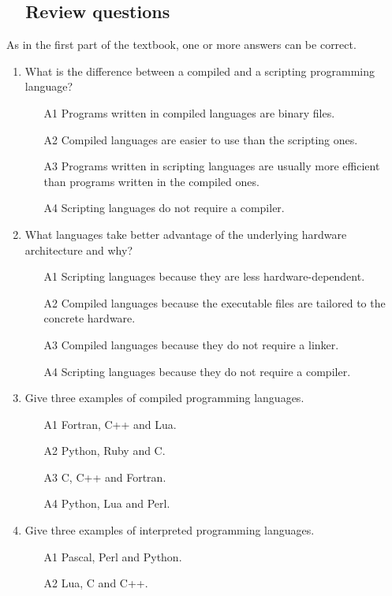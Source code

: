 \subsection{\ \ Review questions}

As in the first part of the textbook, one or more answers can be correct. 
\begin{enumerate}
\item What is the difference between a compiled and a scripting programming language?
\begin{enumerate}
\item[A1] Programs written in compiled languages are binary files. 
\item[A2] Compiled languages are easier to use than the scripting ones.
\item[A3] Programs written in scripting languages are usually more efficient than programs 
          written in the compiled ones.
\item[A4] Scripting languages do not require a compiler.
\end{enumerate}
\item What languages take better advantage of the underlying hardware architecture
      and why?
\begin{enumerate}
\item[A1] Scripting languages because they are less hardware-dependent.
\item[A2] Compiled languages because the executable files are tailored 
          to the concrete hardware.
\item[A3] Compiled languages because  they do not require a linker.
\item[A4] Scripting languages because they do not require a compiler.
\end{enumerate}
\item Give three examples of compiled programming languages.
\begin{enumerate}
\item[A1] Fortran, C++ and Lua.
\item[A2] Python, Ruby and C.
\item[A3] C, C++ and Fortran.
\item[A4] Python, Lua and Perl.
\end{enumerate}
\item Give three examples of interpreted programming languages.
\begin{enumerate}
\item[A1] Pascal, Perl and Python.
\item[A2] Lua, C and C++.

\end{enumerate}
\end{enumerate}

